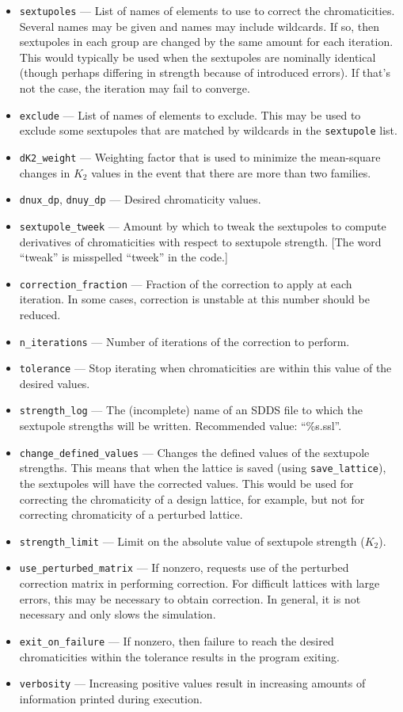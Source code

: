 \documentclass[11pt]{article}
\begin{document}
\begin{itemize}
\item \verb|sextupoles| --- List of names of elements to use to correct the chromaticities.  Several names may be given and names may include
  wildcards. If so, then sextupoles in each group are changed by the same amount for each iteration.
  This would typically be used when the sextupoles are nominally identical (though perhaps differing in strength because of
  introduced errors). If that's not the case, the iteration may fail to converge.
\item \verb|exclude| --- List of names of elements to exclude. This may be used to exclude some sextupoles that are matched by wildcards in
  the \verb|sextupole| list.
\item \verb|dK2_weight| --- Weighting factor that is used to minimize the mean-square changes in $K_2$ values in the
  event that there are more than two families.
\item \verb|dnux_dp|, \verb|dnuy_dp| --- Desired chromaticity values.
\item \verb|sextupole_tweek| --- Amount by which to tweak the sextupoles to compute derivatives of
chromaticities with respect to sextupole strength.  [The word ``tweak'' is misspelled ``tweek'' in the code.]
\item \verb|correction_fraction| --- Fraction of the correction to apply at each iteration.  In some
cases, correction is unstable at this number should be reduced.
\item \verb|n_iterations| --- Number of iterations of the correction to perform.
\item \verb|tolerance| --- Stop iterating when chromaticities are within this value of the
desired values.
\item \verb|strength_log| --- The (incomplete) name of an SDDS file to which the sextupole strengths will
be written.  Recommended value: ``\%s.ssl''.
\item \verb|change_defined_values| --- Changes the defined values of the sextupole strengths.
This means that when the lattice is saved (using \verb|save_lattice|), the sextupoles will
have the corrected values.  This would be used for correcting the chromaticity of a design
lattice, for example, but not for correcting chromaticity of a perturbed lattice.
\item \verb|strength_limit| --- Limit on the absolute value of sextupole strength ($K_2$).
\item \verb|use_perturbed_matrix| --- If nonzero, requests use of the perturbed correction matrix in
performing correction.  For difficult lattices with large errors, this may be necessary
to obtain correction.  In general, it is not necessary and only slows the simulation.
\item \verb|exit_on_failure| --- If nonzero, then failure to reach the desired chromaticities within the
  tolerance results in the program exiting.
\item \verb|verbosity| --- Increasing positive values result in increasing amounts of information printed during
  execution.
\end{itemize}
\end{document}
